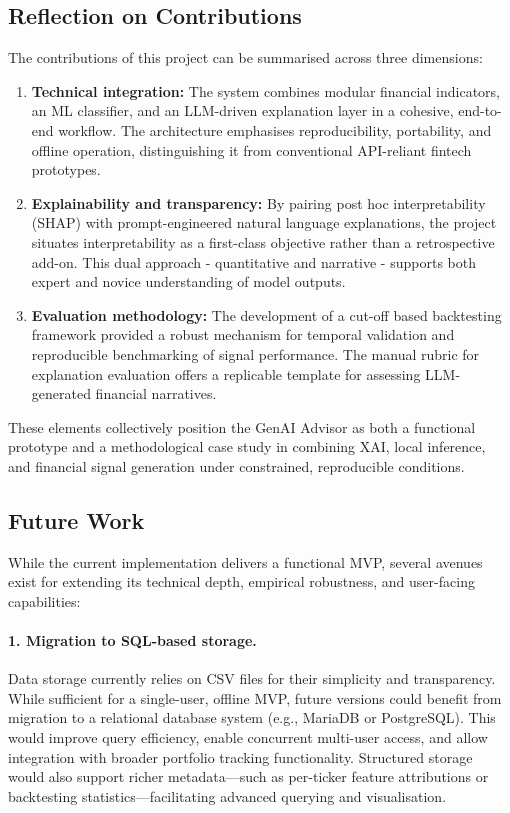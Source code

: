 \subsection{Reflection on Contributions}

The contributions of this project can be summarised across three dimensions:

\begin{enumerate}
\item \textbf{Technical integration:} The system combines modular financial indicators, an ML classifier, and an LLM-driven explanation layer in a cohesive, end-to-end workflow. The architecture emphasises reproducibility, portability, and offline operation, distinguishing it from conventional API-reliant fintech prototypes.
\item \textbf{Explainability and transparency:} By pairing post hoc interpretability (SHAP) with prompt-engineered natural language explanations, the project situates interpretability as a first-class objective rather than a retrospective add-on. This dual approach - quantitative and narrative - supports both expert and novice understanding of model outputs.
\item \textbf{Evaluation methodology:} The development of a cut-off based backtesting framework provided a robust mechanism for temporal validation and reproducible benchmarking of signal performance. The manual rubric for explanation evaluation offers a replicable template for assessing LLM-generated financial narratives.
\end{enumerate}

These elements collectively position the GenAI Advisor as both a functional prototype and a methodological case study in combining XAI, local inference, and financial signal generation under constrained, reproducible conditions.

\subsection{Future Work}

While the current implementation delivers a functional MVP, several avenues exist for extending its technical depth, empirical robustness, and user-facing capabilities:

\paragraph{1. Migration to SQL-based storage.}
Data storage currently relies on CSV files for their simplicity and transparency. While sufficient for a single-user, offline MVP, future versions could benefit from migration to a relational database system (e.g., MariaDB or PostgreSQL). This would improve query efficiency, enable concurrent multi-user access, and allow integration with broader portfolio tracking functionality. Structured storage would also support richer metadata—such as per-ticker feature attributions or backtesting statistics—facilitating advanced querying and visualisation.

